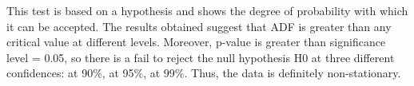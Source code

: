 This test is based on a hypothesis and shows the degree of probability with which it can be accepted. The results obtained suggest that ADF is greater than any critical value at different levels. Moreover, p-value is greater than significance level = 0.05, so there is a fail to reject the null hypothesis H0 at three different confidences: at 90\%, at 95\%, at 99\%. Thus, the data is definitely non-stationary.